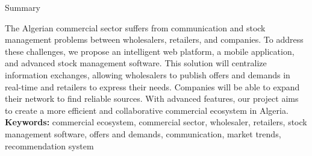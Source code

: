 \documentclass[edit,12pt,a4paper,ChapStyle,oneside,doubleinterligne]{report}
\begin{document}
\begin{center}
    \huge{Summary} 
    \end{center}
    \phantom{hhhh}The Algerian commercial sector suffers from communication and stock management problems between wholesalers, retailers, and companies. To address these challenges, we propose an intelligent web platform, a mobile application, and advanced stock management software. This solution will centralize information exchanges, allowing wholesalers to publish offers and demands in real-time and retailers to express their needs. Companies will be able to expand their network to find reliable sources. With advanced features, our project aims to create a more efficient and collaborative commercial ecosystem in Algeria.
    \newline\textbf{Keywords:} commercial ecosystem, commercial sector, wholesaler, retailers, stock management software, offers and demands, communication, market trends, recommendation system
    

\newpage 
\thispagestyle{empty}
\tableofcontents
\thispagestyle{empty}
\listoffigures
\thispagestyle{empty}
\listoftables
\thispagestyle{empty}
\newpage
\end{document}
